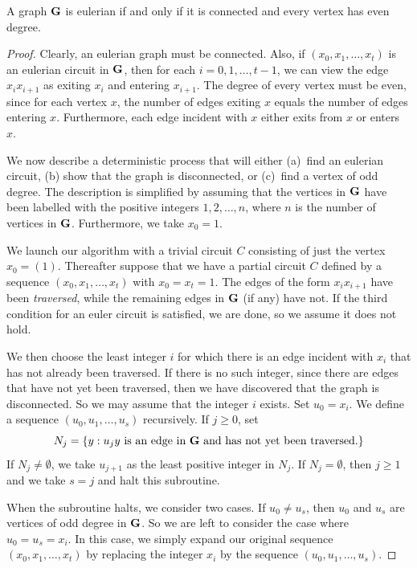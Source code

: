 \begin{theorem}\label{thm:eulerian}
  A graph $\mathbf{G}$ is eulerian if and only if it is connected and 
  every vertex has even degree.
\end{theorem}

\begin{proof}
  Clearly, an eulerian graph must be connected.  Also, if $(x_0,x_1,\dots,x_t)$
  is an eulerian circuit in $\mathbf{G}$, then for each $i=0,1,\dots,t-1$,
  we can view the edge $x_ix_{i+1}$ as exiting $x_i$ and entering $x_{i+1}$.
  The degree of every vertex must be even, since for each vertex $x$, the
  number of edges exiting $x$ equals the number of edges entering $x$.
  Furthermore, each edge incident with $x$ either exits from $x$ or enters~$x$.

  We now describe a deterministic process that will either (a)~find
  an eulerian circuit, (b) show that the graph is disconnected, or
  (c)~find a vertex of odd degree.
  The description is simplified by assuming that the vertices in
  $\mathbf{G}$ have been labelled with the positive integers $1,2,\dots,n$, where
  $n$ is the number of vertices in $\mathbf{G}$.  Furthermore, we take $x_0=1$.

  We launch our algorithm with a trivial circuit $C$ consisting of
  just the vertex $x_0=(1)$.  Thereafter suppose that we have a partial
  circuit $C$ defined by a sequence $(x_0, x_1,\dots,x_t)$ with
  $x_0=x_t=1$. The edges
  of the form $x_ix_{i+1}$ have been \textit{traversed}, while the
  remaining edges in $\mathbf{G}$ (if any) have not.  If the third condition
  for an euler circuit is satisfied, we are done, so we assume it does
  not hold.

  We then choose the least integer $i$ for which there is an edge
  incident with $x_i$ that has not already been traversed.  If there
  is no such integer, since there are edges that have not yet been
  traversed, then we have discovered that the graph is disconnected.
  So we may assume that the integer $i$ exists.  Set $u_0=x_i$.  We
  define a sequence $(u_0,u_1,\dots,u_s)$ recursively.  If $j\ge 0$, set
  \[
   N_j=\{y: u_jy\text{ is an edge in $\mathbf{G}$ and has not yet been traversed.}\}
 \] 
  If  $N_j\neq\emptyset$, we take $u_{j+1}$ as the least positive integer
  in $N_j$. If $N_j=\emptyset$, then $j\ge1$ and we take $s=j$ and halt
  this subroutine.
  
  When the subroutine halts, we consider two cases.  If $u_0\neq u_s$,
  then $u_0$ and $u_s$ are vertices of odd degree in  $\mathbf{G}$.  So we
  are left to consider the case where $u_0=u_s=x_i$.  In this case,
  we simply expand our original sequence $(x_0,x_1,\dots,x_t)$ by
  replacing the integer $x_i$ by the sequence $(u_0,u_1,\dots,u_s)$.
\end{proof}

